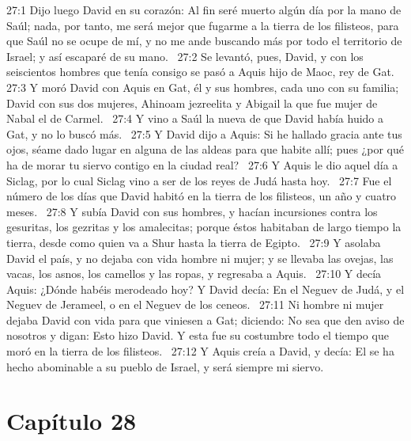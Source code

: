 27:1 Dijo luego David en su corazón: Al fin seré muerto algún día por la mano de Saúl; nada, por tanto, me será mejor que fugarme a la tierra de los filisteos, para que Saúl no se ocupe de mí, y no me ande buscando más por todo el territorio de Israel; y así escaparé de su mano.  
27:2 Se levantó, pues, David, y con los seiscientos hombres que tenía consigo se pasó a Aquis hijo de Maoc, rey de Gat.  
27:3 Y moró David con Aquis en Gat, él y sus hombres, cada uno con su familia; David con sus dos mujeres, Ahinoam jezreelita y Abigail la que fue mujer de Nabal el de Carmel.  
27:4 Y vino a Saúl la nueva de que David había huido a Gat, y no lo buscó más.  
27:5 Y David dijo a Aquis: Si he hallado gracia ante tus ojos, séame dado lugar en alguna de las aldeas para que habite allí; pues ¿por qué ha de morar tu siervo contigo en la ciudad real?  
27:6 Y Aquis le dio aquel día a Siclag, por lo cual Siclag vino a ser de los reyes de Judá hasta hoy.  
27:7 Fue el número de los días que David habitó en la tierra de los filisteos, un año y cuatro meses.  
27:8 Y subía David con sus hombres, y hacían incursiones contra los gesuritas, los gezritas y los amalecitas; porque éstos habitaban de largo tiempo la tierra, desde como quien va a Shur hasta la tierra de Egipto.  
27:9 Y asolaba David el país, y no dejaba con vida hombre ni mujer; y se llevaba las ovejas, las vacas, los asnos, los camellos y las ropas, y regresaba a Aquis.  
27:10 Y decía Aquis: ¿Dónde habéis merodeado hoy? Y David decía: En el Neguev de Judá, y el Neguev de Jerameel, o en el Neguev de los ceneos.  
27:11 Ni hombre ni mujer dejaba David con vida para que viniesen a Gat; diciendo: No sea que den aviso de nosotros y digan: Esto hizo David. Y esta fue su costumbre todo el tiempo que moró en la tierra de los filisteos.  
27:12 Y Aquis creía a David, y decía: El se ha hecho abominable a su pueblo de Israel, y será siempre mi siervo.  
\section*{Capítulo 28}

